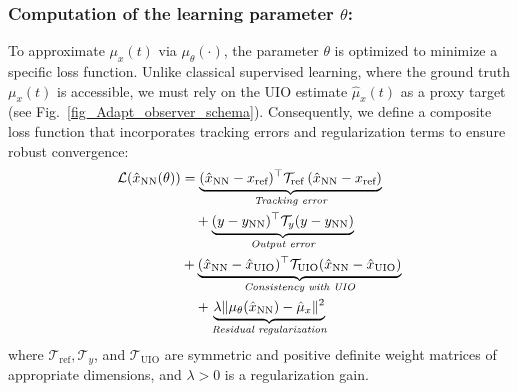 \documentclass{ifacconf}
\def\nn{\mathrm{NN}}
\def\uio{\mathrm{UIO}}
\def\refx{\mathrm{ref}}
\begin{document}
\subsubsection{Computation of the learning parameter $\theta$:}
%
To approximate $\mu_{x}(t)$ via $\mu_{\theta}(\cdot)$, the parameter $\theta$ is optimized to minimize a specific loss function. Unlike classical supervised learning, where the ground truth $\mu_{x}(t)$ is accessible, we must rely on the UIO estimate $\hat{\mu}_{x}(t)$ as a proxy target (see Fig.~\ref{fig_Adapt_observer_schema}). Consequently, we define a composite loss function that incorporates tracking errors and regularization terms to ensure robust convergence:
{
\begin{align}\label{loss_fun}
\mathcal{L}(\hat{x}_{\nn}(\theta)) &= \underbrace{(\hat{x}_{\nn} - x_{\text{ref}})^{\top} \mathcal{T}_{\refx}\,(\hat{x}_{\nn} - x_{\text{ref}})}_{\textit{Tracking error}} \notag \\
&\quad+ 
\underbrace{(y - y_{\nn})^{\top} \mathcal{T}_{y} (y - y_{\nn})}_{\textit{Output error}} \notag \\
&+ \underbrace{(\hat{x}_{\nn} - \hat{x}_{\uio})^{\top} \mathcal{T}_{\uio} (\hat{x}_{\nn} - \hat{x}_{\uio})}_{\textit{Consistency with UIO}} \notag \\
&\quad+ 
\underbrace{\lambda \| \mu_{\theta}(\hat{x}_{\nn}) - \hat{\mu}_{x} \|^2}_{\textit{Residual regularization}}   
\end{align}
}
where $\mathcal{T}_{\refx}, \mathcal{T}_{y}$, and $\mathcal{T}_{\uio}$ are symmetric and positive definite weight matrices of appropriate dimensions, and $\lambda > 0$ is a regularization gain.
\end{document}
